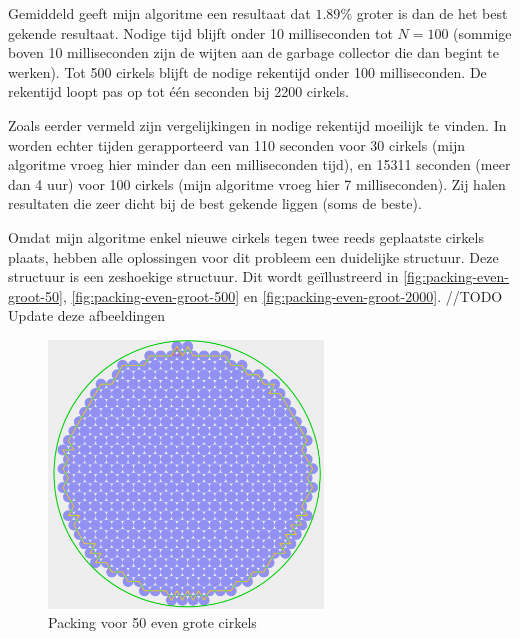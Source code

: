 \documentclass[12pt,a4paper,oneside]{book}
\begin{document}
 \label{table:packomania-equal}

Gemiddeld geeft mijn algoritme een resultaat dat $1.89\%$ groter is dan de het best gekende resultaat.
Nodige tijd blijft onder 10 milliseconden tot $N=100$ (sommige boven 10 milliseconden zijn de wijten aan de garbage collector die dan begint te werken).
Tot 500 cirkels blijft de nodige rekentijd onder 100 milliseconden.
De rekentijd loopt pas op tot één seconden bij 2200 cirkels.

Zoals eerder vermeld zijn vergelijkingen in nodige rekentijd moeilijk te vinden.
In \cite{grosso2010} worden echter tijden gerapporteerd van 110 seconden voor 30 cirkels (mijn algoritme vroeg hier minder dan een milliseconden tijd), en 15311 seconden (meer dan 4 uur) voor 100 cirkels (mijn algoritme vroeg hier 7 milliseconden).
Zij halen resultaten die zeer dicht bij de best gekende liggen (soms de beste).

Omdat mijn algoritme enkel nieuwe cirkels tegen twee reeds geplaatste cirkels plaats, hebben alle oplossingen voor dit probleem een duidelijke structuur.
Deze structuur is een zeshoekige structuur.
Dit wordt geïllustreerd in \autoref{fig:packing-even-groot-50}, \autoref{fig:packing-even-groot-500} en \autoref{fig:packing-even-groot-2000}.
//TODO Update deze afbeeldingen

\begin{figure}
  \centering
  \includegraphics[width=0.65\textwidth]{packing-even-groot-50.png}
  \caption{Packing voor 50 even grote cirkels} \label{fig:packing-even-groot-50} 
\end{figure}
\end{document}
